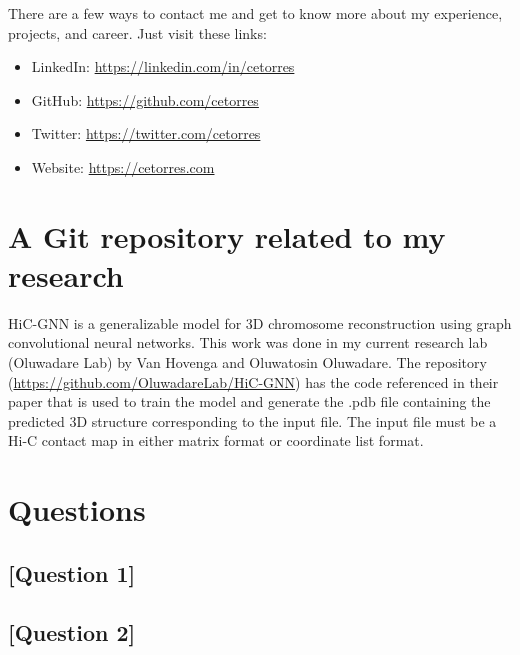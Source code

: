 There are a few ways to contact me and get to know more about my experience, projects, and career. Just visit these links:
\begin{itemize}
    \item LinkedIn: \url{https://linkedin.com/in/cetorres}
    \item GitHub: \url{https://github.com/cetorres}
    \item Twitter: \url{https://twitter.com/cetorres}
    \item Website: \url{https://cetorres.com}
\end{itemize}

\section{A Git repository related to my research}

HiC-GNN is a generalizable model for 3D chromosome reconstruction using graph convolutional neural networks. This work was done in my current research lab (Oluwadare Lab) by Van Hovenga and Oluwatosin Oluwadare. The repository (\url{https://github.com/OluwadareLab/HiC-GNN}) has the code referenced in their paper that is used to train the model and generate the .pdb file containing the predicted 3D structure corresponding to the input file. The input file must be a Hi-C contact map in either matrix format or coordinate list format.


\section{Questions}

\subsection{[Question 1]}

\subsection{[Question 2]}

% 
